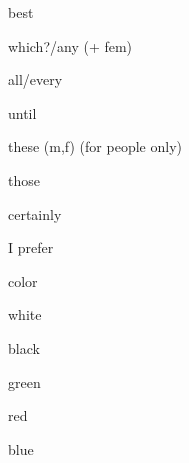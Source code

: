 \begin{flashcard}{\LARGE best}
\LARGE {}
\end{flashcard}
\begin{flashcard}{\LARGE which?/any (+ fem)}
\LARGE {}
\end{flashcard}
\begin{flashcard}{\LARGE all/every}
\LARGE {}
\end{flashcard}
\begin{flashcard}{\LARGE until}
\LARGE {}
\end{flashcard}
\begin{flashcard}{\LARGE these (m,f) (for people only)}
\LARGE {}
\end{flashcard}
\begin{flashcard}{\LARGE those}
\LARGE {}
\end{flashcard}
\begin{flashcard}{\LARGE certainly}
\LARGE {}
\end{flashcard}
\begin{flashcard}{\LARGE I prefer}
\LARGE {}
\end{flashcard}
\begin{flashcard}{\LARGE color}
\LARGE {}
\end{flashcard}
\begin{flashcard}{\LARGE white}
\LARGE {}
\end{flashcard}
\begin{flashcard}{\LARGE black}
\LARGE {}
\end{flashcard}
\begin{flashcard}{\LARGE green}
\LARGE {}
\end{flashcard}
\begin{flashcard}{\LARGE red}
\LARGE {}
\end{flashcard}
\begin{flashcard}{\LARGE blue}
\LARGE {}
\end{flashcard}
